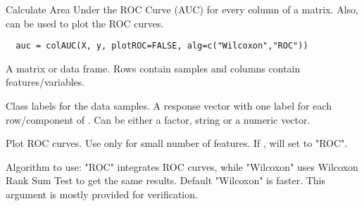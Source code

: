 \begin{Description}\relax
Calculate Area Under the ROC Curve (AUC) for every column of a 
matrix. Also, can be used to plot the ROC curves.
\end{Description}
\begin{Usage}
\begin{verbatim}
  auc = colAUC(X, y, plotROC=FALSE, alg=c("Wilcoxon","ROC"))
\end{verbatim}
\end{Usage}
\begin{Arguments}
\begin{ldescription}
\item[\code{X}] A matrix or data frame. Rows contain samples 
and columns contain features/variables.
\item[\code{y}] Class labels for the  data samples. 
A response vector with one label for each row/component of .
Can be either a factor, string or a numeric vector.
\item[\code{plotROC}] Plot ROC curves. Use only for small number of features. 
If , will set  to "ROC".
\item[\code{alg}] Algorithm to use: "ROC" integrates ROC curves, while "Wilcoxon"
uses Wilcoxon Rank Sum Test to get the same results. Default "Wilcoxon" is
faster. This argument is mostly provided for verification.
\end{ldescription}
\end{Arguments}
